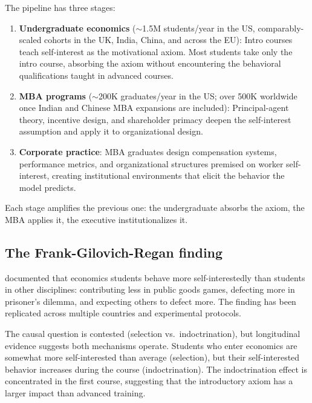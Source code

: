 \begin{model}
\label{mod:education-pipeline}
The pipeline has three stages:
\begin{enumerate}[nosep]
  \item \textbf{Undergraduate economics} ($\sim$1.5M students/year in the US, comparably-scaled cohorts in the UK, India, China, and across the EU): Intro courses teach self-interest as the motivational axiom. Most students take only the intro course, absorbing the axiom without encountering the behavioral qualifications taught in advanced courses.
  \item \textbf{MBA programs} ($\sim$200K graduates/year in the US; over 500K worldwide once Indian and Chinese MBA expansions are included): Principal-agent theory, incentive design, and shareholder primacy deepen the self-interest assumption and apply it to organizational design.
  \item \textbf{Corporate practice}: MBA graduates design compensation systems, performance metrics, and organizational structures premised on worker self-interest, creating institutional environments that elicit the behavior the model predicts.
\end{enumerate}
Each stage amplifies the previous one: the undergraduate absorbs the axiom, the MBA applies it, the executive institutionalizes it.
\end{model}

\subsection{The Frank-Gilovich-Regan finding}

\textcite{frank1993} documented that economics students behave more self-interestedly than students in other disciplines: contributing less in public goods games, defecting more in prisoner's dilemma, and expecting others to defect more.
The finding has been replicated across multiple countries and experimental protocols.

The causal question is contested (selection vs.\ indoctrination), but longitudinal evidence suggests both mechanisms operate.
Students who enter economics are somewhat more self-interested than average (selection), but their self-interested behavior increases during the course (indoctrination).
The indoctrination effect is concentrated in the first course, suggesting that the introductory axiom has a larger impact than advanced training.

